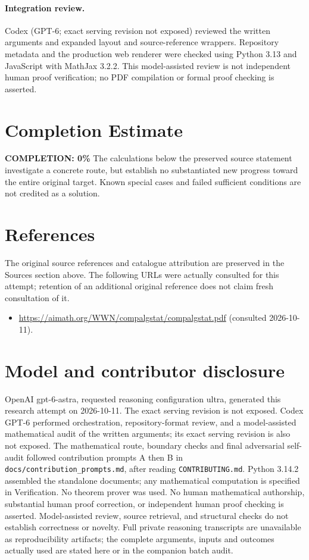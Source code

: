 \documentclass[11pt]{article}
\begin{document}
\paragraph{Integration review.} Codex (GPT-6; exact serving revision not exposed) reviewed the written arguments and expanded layout and source-reference wrappers. Repository metadata and the production web renderer were checked using Python 3.13 and JavaScript with MathJax 3.2.2. This model-assisted review is not independent human proof verification; no PDF compilation or formal proof checking is asserted.

\section{Completion Estimate}
\noindent\textbf{COMPLETION: 0\%}
The calculations below the preserved source statement investigate a concrete route,
but establish no substantiated new progress toward the entire original target.
Known special cases and failed sufficient conditions are not credited as a solution.
\section{References}
The original source references and catalogue attribution are preserved in the
Sources section above. The following URLs were actually consulted for this attempt;
retention of an additional original reference does not claim fresh consultation of it.
\begin{itemize}
\item \url{https://aimath.org/WWN/compalgstat/compalgstat.pdf} (consulted 2026-10-11). 
\end{itemize}
\section{Model and contributor disclosure}
OpenAI gpt-6-astra, requested reasoning configuration ultra, generated this research
attempt on 2026-10-11. The exact serving revision is not exposed. Codex GPT-6
performed orchestration, repository-format review, and a model-assisted mathematical
audit of the written arguments; its exact serving revision
is also not exposed. The mathematical route, boundary checks and final adversarial
self-audit followed contribution prompts A then B in
\texttt{docs/contribution\_prompts.md}, after reading \texttt{CONTRIBUTING.md}.
Python 3.14.2 assembled the standalone documents; any mathematical computation is
specified in Verification. No theorem prover was used. No human mathematical
authorship, substantial human proof correction, or independent human proof checking
is asserted. Model-assisted review, source retrieval, and structural checks do not
establish correctness or novelty. Full private reasoning transcripts are unavailable
as reproducibility artifacts; the complete arguments, inputs and outcomes actually
used are stated here or in the companion batch audit.
\end{document}
